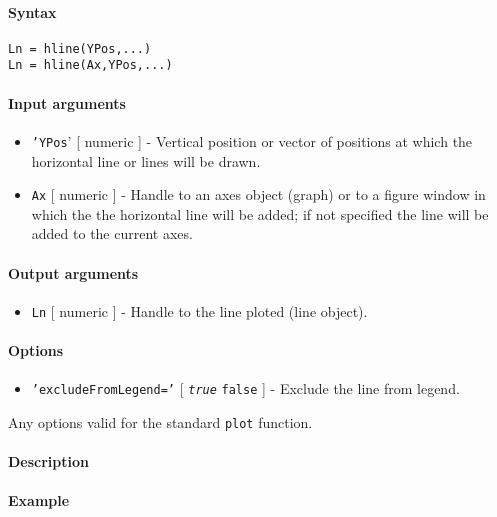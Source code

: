 


	\paragraph{Syntax}\label{syntax}

\begin{verbatim}
Ln = hline(YPos,...)
Ln = hline(Ax,YPos,...)
\end{verbatim}

\paragraph{Input arguments}\label{input-arguments}

\begin{itemize}
\item
  \texttt{'YPos}' {[} numeric {]} - Vertical position or vector of
  positions at which the horizontal line or lines will be drawn.
\item
  \texttt{Ax} {[} numeric {]} - Handle to an axes object (graph) or to a
  figure window in which the the horizontal line will be added; if not
  specified the line will be added to the current axes.
\end{itemize}

\paragraph{Output arguments}\label{output-arguments}

\begin{itemize}
\itemsep1pt\parskip0pt
\item
  \texttt{Ln} {[} numeric {]} - Handle to the line ploted (line object).
\end{itemize}

\paragraph{Options}\label{options}

\begin{itemize}
\itemsep1pt\parskip0pt
\item
  \texttt{'excludeFromLegend='} {[} \emph{\texttt{true}} \textbar{}
  \texttt{false} {]} - Exclude the line from legend.
\end{itemize}

Any options valid for the standard \texttt{plot} function.

\paragraph{Description}\label{description}

\paragraph{Example}\label{example}


